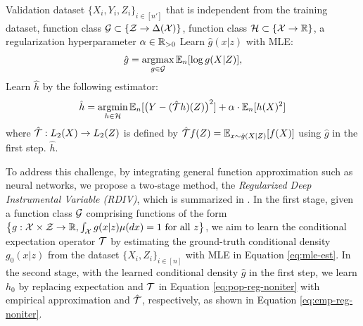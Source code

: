 \begin{algorithm}[!t] 
\caption{Regularized Deep IV (RDIV) }

\begin{algorithmic}[1]\label{alg:dbiv-noniterative}
        \REQUIRE Validation dataset $\{X_i,Y_i,Z_i\}_{i\in[n']}$ that is independent from the training dataset, function class $\mathcal{G}\subset \{\mathcal{Z} \to \Delta(\mathcal{X})\}$, function class $\mathcal{H} \subset \{\mathcal{X} \to \mathbb{R}\}$, a regularization hyperparameter $\alpha \in \mathbb{R}_{>0}$
        \STATE Learn $\hat{g}(x|z)$ with MLE: 
        \begin{align}\label{eq:mle-est}
    \hat{g} = \mathop{\mathrm{argmax}}_{g\in\mathcal{G}} \mathbb{E}_n[\log g(X|Z)],
\end{align} 
        \STATE   Learn $\hat{h}$ by the following estimator:  
        \begin{align}\label{eq:emp-reg-noniter}
    \hat{h}= \mathop{\mathrm{argmin}}_{h\in\mathcal{H}} \mathbb{E}_n[\big(Y - (\hat{{\mathcal{T}}} h)(Z)\big)^2]+ \alpha \cdot \mathbb{E}_n[h(X)^2]
    \end{align}
    where  $\hat{{\mathcal{T}}}: L_2(X) \rightarrow L_2(Z)$ is defined by $\hat{{\mathcal{T}}} f(Z) = \mathbb{E}_{x\sim \hat{g}(X|Z)}[f(X)]$ using $\hat g$ in the first step. 
    \OUTPUT $\hat{h}$.
\end{algorithmic}
\end{algorithm}


To address this challenge, by integrating general function approximation such as neural networks, we propose a two-stage method, the \emph{Regularized Deep Instrumental Variable (RDIV)}, which is summarized in . In the first stage, given a function class $\mathcal{G}$ comprising functions of the form $\big\{g: \mathcal{X}\times\mathcal{Z} \rightarrow \mathbb{R},\int_{\mathcal{X}} g(x|z) \mu(dx) =1 \text{ for all } z\big\}$, we aim to learn the conditional expectation operator ${\mathcal{T}}$ by estimating the ground-truth conditional density $g_0(x|z)$ from the dataset $\{X_i, Z_i\}_{i\in[n]}$ with MLE in Equation \eqref{eq:mle-est}. In the second stage, with the learned conditional density $\hat{g}$ in the first step, we learn $h_0$ by replacing expectation and ${\mathcal{T}}$ in Equation \eqref{eq:pop-reg-noniter} with empirical approximation and $\hat {{\mathcal{T}}}$, respectively, as shown in Equation \eqref{eq:emp-reg-noniter}. 




